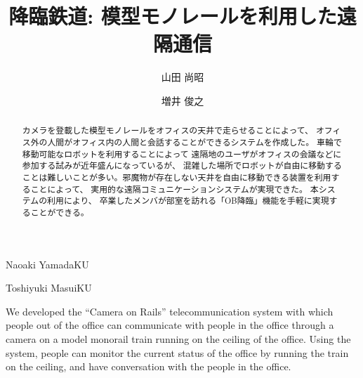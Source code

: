 \documentclass[submit,techreq]{ipsj}
\begin{document}
\title{降臨鉄道: 模型モノレールを利用した遠隔通信}


\author{山田 尚昭}{Naoaki Yamada}{KU}
\author{増井 俊之}{Toshiyuki Masui}{KU}

\begin{abstract}

カメラを登載した模型モノレールをオフィスの天井で走らせることによって、
オフィス外の人間がオフィス内の人間と会話することができるシステムを作成した。
車輪で移動可能なロボットを利用することによって
遠隔地のユーザがオフィスの会議などに参加する試みが近年盛んになっているが、
混雑した場所でロボットが自由に移動することは難しいことが多い。邪魔物が存在しない天井を自由に移動できる装置を利用することによって、
実用的な遠隔コミュニケーションシステムが実現できた。
本システムの利用により、
卒業したメンバが部室を訪れる「OB降臨」機能を手軽に実現することができる。
\end{abstract}

%
\begin{eabstract}
We developed the ``Camera on Rails'' telecommunication system with
which people out of the office can communicate with people in the
office through a camera on a model monorail train running on the ceiling
of the office. Using the system, people can monitor the current status
of the office by running the train on the ceiling, and have
conversation with the people in the office.
\end{eabstract}
%

\maketitle
\end{document}
